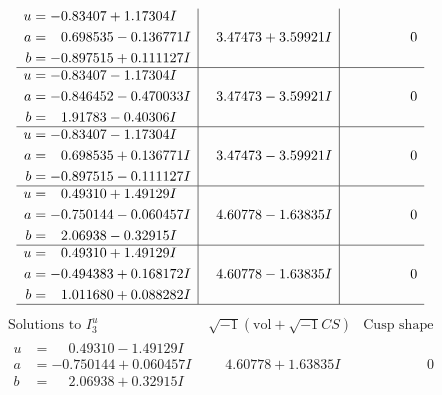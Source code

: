 \documentclass[1p]{elsarticle_modified}
\theoremstyle{definition}
\newcommand{\I}{\sqrt{-1}}
\begin{document}
$$\begin{array}{c|c|c}
\begin{aligned}
u &= -0.83407 + 1.17304 I \\
a &= \phantom{-}0.698535 - 0.136771 I \\
b &= -0.897515 + 0.111127 I\end{aligned}
 & \phantom{-}3.47473 + 3.59921 I & \phantom{-0.000000 } 0 \\ \hline\begin{aligned}
u &= -0.83407 - 1.17304 I \\
a &= -0.846452 - 0.470033 I \\
b &= \phantom{-}1.91783 - 0.40306 I\end{aligned}
 & \phantom{-}3.47473 - 3.59921 I & \phantom{-0.000000 } 0 \\ \hline\begin{aligned}
u &= -0.83407 - 1.17304 I \\
a &= \phantom{-}0.698535 + 0.136771 I \\
b &= -0.897515 - 0.111127 I\end{aligned}
 & \phantom{-}3.47473 - 3.59921 I & \phantom{-0.000000 } 0 \\ \hline\begin{aligned}
u &= \phantom{-}0.49310 + 1.49129 I \\
a &= -0.750144 - 0.060457 I \\
b &= \phantom{-}2.06938 - 0.32915 I\end{aligned}
 & \phantom{-}4.60778 - 1.63835 I & \phantom{-0.000000 } 0 \\ \hline\begin{aligned}
u &= \phantom{-}0.49310 + 1.49129 I \\
a &= -0.494383 + 0.168172 I \\
b &= \phantom{-}1.011680 + 0.088282 I\end{aligned}
 & \phantom{-}4.60778 - 1.63835 I & \phantom{-0.000000 } 0\\
 \hline 
 \end{array}$$\newpage$$\begin{array}{c|c|c}  
\text{Solutions to }I^u_{3}& \I (\text{vol} + \sqrt{-1}CS) & \text{Cusp shape}\\
 \hline 
\begin{aligned}
u &= \phantom{-}0.49310 - 1.49129 I \\
a &= -0.750144 + 0.060457 I \\
b &= \phantom{-}2.06938 + 0.32915 I\end{aligned}
 & \phantom{-}4.60778 + 1.63835 I & \phantom{-0.000000 } 0 \\ \hline\begin{aligned}

\end{aligned}
\end{array}$$
\end{document}
